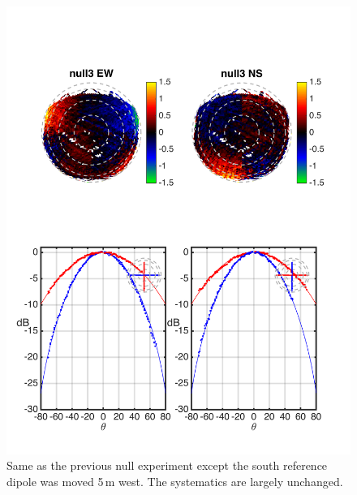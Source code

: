 \documentclass[preprint]{aastex}
\begin{document}
\begin{figure}[h]
\includegraphics[width=6.5in]{null3_rel.png}
\caption{Same as the previous null experiment except the south reference dipole was moved 5\,m west. The systematics are largely unchanged.}
\label{fig:null3}
\end{figure}
\end{document}
